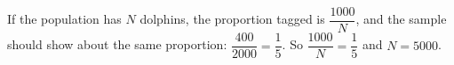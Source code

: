 If the population has $N$ dolphins, the proportion tagged is $\dfrac{1000}{N}$, and the sample should show about the same proportion: $\dfrac{400}{2000}=\dfrac{1}{5}$. So $\dfrac{1000}{N}=\dfrac{1}{5}$ and $N=\boxed{5000}$.
